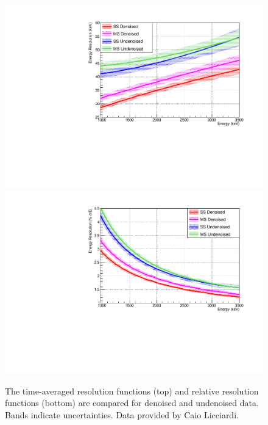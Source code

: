 \begin{figure}
\begin{center}
\includegraphics[keepaspectratio=true,width=.95\textwidth]{ResolutionFunctionComparison_absolute.pdf}
\includegraphics[keepaspectratio=true,width=.95\textwidth]{ResolutionFunctionComparison_relative.pdf}
\end{center}
\renewcommand{\baselinestretch}{1}
\small\normalsize
\begin{quote}
\caption{The time-averaged resolution functions (top) and relative resolution functions (bottom) are compared for denoised and undenoised data.  Bands indicate uncertainties.  Data provided by Caio Licciardi.}
\label{fig:ResolutionFunctionComparison}
\end{quote}
\end{figure}
\renewcommand{\baselinestretch}{2}
\small\normalsize

